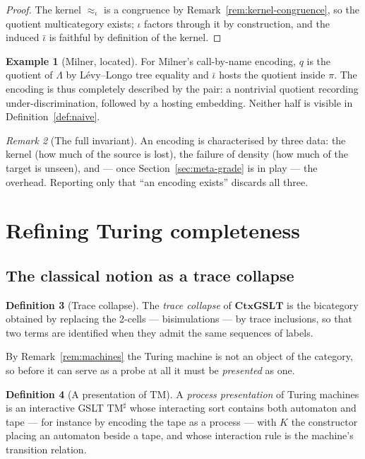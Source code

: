 \documentclass[11pt,a4paper]{article}
\theoremstyle{definition}
\newtheorem{definition}{Definition}[section]
\newtheorem{example}[definition]{Example}
\theoremstyle{plain}
\theoremstyle{remark}
\newtheorem{remark}[definition]{Remark}
\newcommand{\CtxGSLT}{\mathbf{CtxGSLT}}
\begin{document}
\begin{proof}
The kernel $\approx_\iota$ is a congruence by
Remark~\ref{rem:kernel-congruence}, so the quotient multicategory exists; $\iota$
factors through it by construction, and the induced $\bar\iota$ is faithful by
definition of the kernel.
\end{proof}

\begin{example}[Milner, located]
\label{ex:milner}
For Milner's call-by-name encoding, $q$ is the quotient of $\Lambda$ by L\'evy--Longo
tree equality and $\bar\iota$ hosts the quotient inside $\pi$. The encoding is thus
completely described by the pair: a nontrivial quotient recording under-discrimination,
followed by a hosting embedding. Neither half is visible in
Definition~\ref{def:naive}.
\end{example}

\begin{remark}[The full invariant]
An encoding is characterised by three data: the kernel (how much of the source is
lost), the failure of density (how much of the target is unseen), and --- once
Section~\ref{sec:meta-grade} is in play --- the overhead. Reporting only that ``an
encoding exists'' discards all three.
\end{remark}

\section{Refining Turing completeness}
\label{sec:tc}

\subsection{The classical notion as a trace collapse}

\begin{definition}[Trace collapse]
\label{def:collapse}
The \emph{trace collapse} of $\CtxGSLT$ is the bicategory obtained by replacing the
2-cells --- bisimulations --- by trace inclusions, so that two terms are identified
when they admit the same sequences of labels.
\end{definition}

By Remark~\ref{rem:machines} the Turing machine is not an object of the category, so
before it can serve as a probe at all it must be \emph{presented} as one.

\begin{definition}[A presentation of $\mathrm{TM}$]
\label{def:tmpres}
A \emph{process presentation} of Turing machines is an interactive GSLT
$\mathrm{TM}^\sharp$ whose interacting sort contains both automaton and tape --- for
instance by encoding the tape as a process --- with $K$ the constructor placing an
automaton beside a tape, and whose interaction rule is the machine's transition
relation.
\end{definition}
\end{document}
